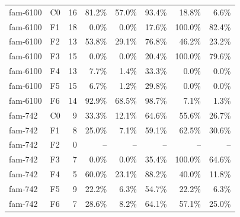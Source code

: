 \begin{tabular}{llrrrrrr}
fam-6100 & C0 & 16 & 81.2\% & 57.0\% & 93.4\% & 18.8\% & 6.6\% \\
fam-6100 & F1 & 18 & 0.0\% & 0.0\% & 17.6\% & 100.0\% & 82.4\% \\
fam-6100 & F2 & 13 & 53.8\% & 29.1\% & 76.8\% & 46.2\% & 23.2\% \\
fam-6100 & F3 & 15 & 0.0\% & 0.0\% & 20.4\% & 100.0\% & 79.6\% \\
fam-6100 & F4 & 13 & 7.7\% & 1.4\% & 33.3\% & 0.0\% & 0.0\% \\
fam-6100 & F5 & 15 & 6.7\% & 1.2\% & 29.8\% & 0.0\% & 0.0\% \\
fam-6100 & F6 & 14 & 92.9\% & 68.5\% & 98.7\% & 7.1\% & 1.3\% \\
fam-742 & C0 & 9 & 33.3\% & 12.1\% & 64.6\% & 55.6\% & 26.7\% \\
fam-742 & F1 & 8 & 25.0\% & 7.1\% & 59.1\% & 62.5\% & 30.6\% \\
fam-742 & F2 & 0 & -- & -- & -- & -- & -- \\
fam-742 & F3 & 7 & 0.0\% & 0.0\% & 35.4\% & 100.0\% & 64.6\% \\
fam-742 & F4 & 5 & 60.0\% & 23.1\% & 88.2\% & 40.0\% & 11.8\% \\
fam-742 & F5 & 9 & 22.2\% & 6.3\% & 54.7\% & 22.2\% & 6.3\% \\
fam-742 & F6 & 7 & 28.6\% & 8.2\% & 64.1\% & 57.1\% & 25.0\% \\
\bottomrule
\end{tabular}

